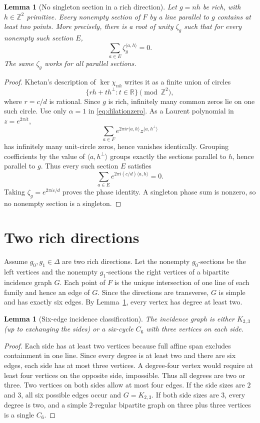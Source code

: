 \documentclass[11pt]{article}
\newtheorem{lemma}[theorem]{Lemma}
\newcommand{\Z}{\mathbb Z}
\begin{document}
\begin{lemma}[No singleton section in a rich direction]\label{lem:nosingleton}
Let $g=nh$ be rich, with $h\in\Z^2$ primitive. Every nonempty section of $F$ by a line parallel to $g$ contains at least two points. More precisely, there is a root of unity $\zeta_g$ such that for every nonempty such section $E$,
\[
 \sum_{a\in E}\zeta_g^{\langle a,h\rangle}=0.
\]
The same $\zeta_g$ works for all parallel sections.
\end{lemma}
\begin{proof}
Khetan's description of $\ker\chi_{nh}$ writes it as a finite union of circles
\[
 \{rh+t h^\perp:t\in\mathbb R\}\pmod{\Z^2},
\]
where $r=c/d$ is rational. Since $g$ is rich, infinitely many common zeros lie on one such circle. Use only $\alpha=1$ in \eqref{eq:dilationzero}. As a Laurent polynomial in $z=e^{2\pi i t}$,
\[
 \sum_{a\in F}e^{2\pi i r\langle a,h\rangle}z^{\langle a,h^\perp\rangle}
\]
has infinitely many unit-circle zeros, hence vanishes identically. Grouping coefficients by the value of $\langle a,h^\perp\rangle$ groups exactly the sections parallel to $h$, hence parallel to $g$. Thus every such section $E$ satisfies
\[
 \sum_{a\in E}e^{2\pi i(c/d)\langle a,h\rangle}=0.
\]
Taking $\zeta_g=e^{2\pi i c/d}$ proves the phase identity. A singleton phase sum is nonzero, so no nonempty section is a singleton.
\end{proof}

\section{Two rich directions}
Assume $g_0,g_1\in\Delta$ are two rich directions. Let the nonempty $g_0$-sections be the left vertices and the nonempty $g_1$-sections the right vertices of a bipartite incidence graph $G$. Each point of $F$ is the unique intersection of one line of each family and hence an edge of $G$. Since the directions are transverse, $G$ is simple and has exactly six edges. By Lemma~\ref{lem:nosingleton}, every vertex has degree at least two.

\begin{lemma}[Six-edge incidence classification]\label{lem:incidence}
The incidence graph is either $K_{2,3}$ (up to exchanging the sides) or a six-cycle $C_6$ with three vertices on each side.
\end{lemma}
\begin{proof}
Each side has at least two vertices because full affine span excludes containment in one line. Since every degree is at least two and there are six edges, each side has at most three vertices. A degree-four vertex would require at least four vertices on the opposite side, impossible. Thus all degrees are two or three. Two vertices on both sides allow at most four edges. If the side sizes are $2$ and $3$, all six possible edges occur and $G=K_{2,3}$. If both side sizes are $3$, every degree is two, and a simple $2$-regular bipartite graph on three plus three vertices is a single $C_6$.
\end{proof}
\end{document}
